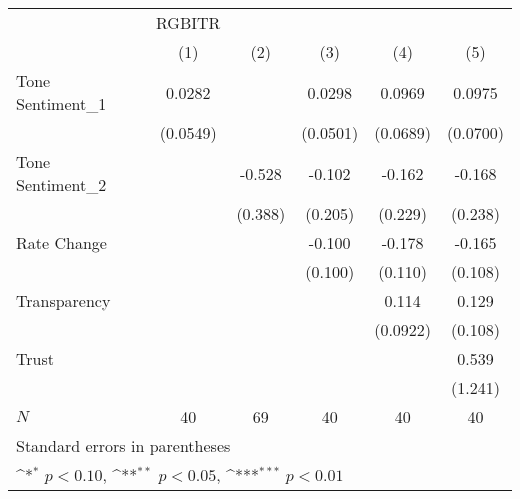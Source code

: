{
\def\sym#1{\ifmmode^{#1}\else\(^{#1}\)\fi}
\begin{tabular}{l*{5}{c}}
\hline\hline
            &      RGBITR         &                     &                     &                     &                     \\
            &\multicolumn{1}{c}{(1)}         &\multicolumn{1}{c}{(2)}         &\multicolumn{1}{c}{(3)}         &\multicolumn{1}{c}{(4)}         &\multicolumn{1}{c}{(5)}         \\
\hline
Tone Sentiment\_{1}&      0.0282         &                     &      0.0298         &      0.0969         &      0.0975         \\
            &    (0.0549)         &                     &    (0.0501)         &    (0.0689)         &    (0.0700)         \\
[1em]
Tone Sentiment\_{2}&                     &      -0.528         &      -0.102         &      -0.162         &      -0.168         \\
            &                     &     (0.388)         &     (0.205)         &     (0.229)         &     (0.238)         \\
[1em]
Rate Change &                     &                     &      -0.100         &      -0.178         &      -0.165         \\
            &                     &                     &     (0.100)         &     (0.110)         &     (0.108)         \\
[1em]
Transparency&                     &                     &                     &       0.114         &       0.129         \\
            &                     &                     &                     &    (0.0922)         &     (0.108)         \\
[1em]
Trust       &                     &                     &                     &                     &       0.539         \\
            &                     &                     &                     &                     &     (1.241)         \\
\hline
\(N\)       &          40         &          69         &          40         &          40         &          40         \\
\hline\hline
\multicolumn{6}{l}{\footnotesize Standard errors in parentheses}\\
\multicolumn{6}{l}{\footnotesize \sym{*} \(p<0.10\), \sym{**} \(p<0.05\), \sym{***} \(p<0.01\)}\\
\end{tabular}
}
